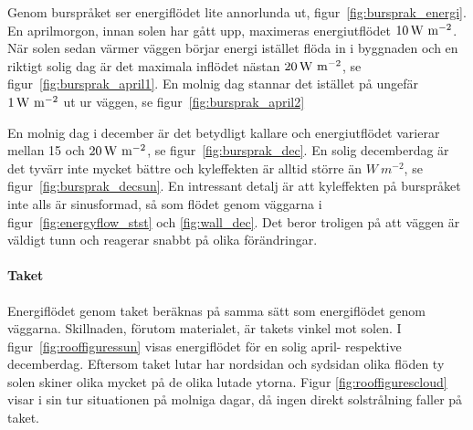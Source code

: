 Genom burspråket ser energiflödet lite annorlunda ut, figur~\ref{fig:bursprak_energi}. En aprilmorgon, innan solen har gått upp, maximeras energiutflödet $\unit[10]{W~m^{-2}}$. När solen sedan värmer väggen börjar energi istället flöda in i byggnaden och en riktigt solig dag är det maximala inflödet nästan $\unit[20]{W~m^{-2}}$, se figur~\ref{fig:bursprak_april1}. En molnig dag stannar det istället på ungefär $\unit[1]{W~m^{-2}}$ ut ur väggen, se figur~\ref{fig:bursprak_april2}

 En molnig dag  i december är det betydligt kallare och energiutflödet varierar mellan 15 och $\unit[20]{W~m^{-2}}$, se figur~\ref{fig:bursprak_dec}. En solig decemberdag är det tyvärr inte mycket bättre och kyleffekten är alltid större än $\unit{W~m^{-2}}$, se figur~\ref{fig:bursprak_decsun}.
 En intressant detalj är att kyleffekten på burspråket inte alls är sinusformad, så som flödet genom väggarna i figur~\ref{fig:energyflow_stst} och \ref{fig:wall_dec}. Det beror troligen på att väggen är väldigt tunn och reagerar snabbt på olika förändringar.

\paragraph{Taket}

Energiflödet genom taket beräknas på samma sätt som energiflödet genom väggarna. Skillnaden, förutom materialet, är takets vinkel mot solen. I figur~\ref{fig:rooffiguressun} visas energiflödet för en solig april- respektive decemberdag. Eftersom taket lutar har nordsidan och sydsidan olika flöden ty solen skiner olika mycket på de olika lutade ytorna. Figur \ref{fig:rooffigurescloud} visar i sin tur situationen på molniga dagar, då ingen direkt solstrålning faller på taket.

